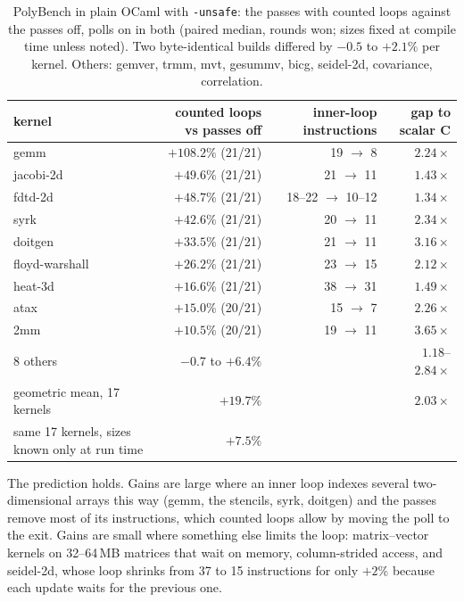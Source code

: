 \begin{table}[h]
  \centering
  \small
  \begin{tabular}{@{}lrrr@{}}
    \toprule
    kernel & counted loops vs passes off & inner-loop instructions & gap to scalar C \\
    \midrule
    gemm & $+108.2\%$ (21/21) & 19 $\to$ 8 & $2.24\times$ \\
    jacobi-2d & $+49.6\%$ (21/21) & 21 $\to$ 11 & $1.43\times$ \\
    fdtd-2d & $+48.7\%$ (21/21) & 18--22 $\to$ 10--12 & $1.34\times$ \\
    syrk & $+42.6\%$ (21/21) & 20 $\to$ 11 & $2.34\times$ \\
    doitgen & $+33.5\%$ (21/21) & 21 $\to$ 11 & $3.16\times$ \\
    floyd-warshall & $+26.2\%$ (21/21) & 23 $\to$ 15 & $2.12\times$ \\
    heat-3d & $+16.6\%$ (21/21) & 38 $\to$ 31 & $1.49\times$ \\
    atax & $+15.0\%$ (20/21) & 15 $\to$ 7 & $2.26\times$ \\
    2mm & $+10.5\%$ (20/21) & 19 $\to$ 11 & $3.65\times$ \\
    8 others & $-0.7$ to $+6.4\%$ & & $1.18$--$2.84\times$ \\
    \midrule
    geometric mean, 17 kernels & $+19.7\%$ & & $2.03\times$ \\
    \quad same 17 kernels, sizes known only at run time & $+7.5\%$ & & \\
    \bottomrule
  \end{tabular}
  \caption{PolyBench in plain OCaml with \texttt{-unsafe}: the passes with
  counted loops against the passes off, polls on in both (paired median,
  rounds won; sizes fixed at compile time unless noted). Two
  byte-identical builds differed by $-0.5$ to $+2.1\%$ per kernel. Others:
  gemver, trmm, mvt, gesummv, bicg, seidel-2d, covariance, correlation.}
  \label{tab:polybench}
\end{table}

The prediction holds. Gains are large where an inner loop indexes several
two-dimensional arrays this way (gemm, the stencils, syrk, doitgen) and the
passes remove most of its instructions, which counted loops allow by moving
the poll to the exit. Gains are small where something else
limits the loop: matrix--vector kernels on 32--64\,MB matrices that wait on
memory, column-strided access, and seidel-2d, whose loop shrinks from 37 to 15
instructions for only $+2\%$ because each update waits for the previous one.

